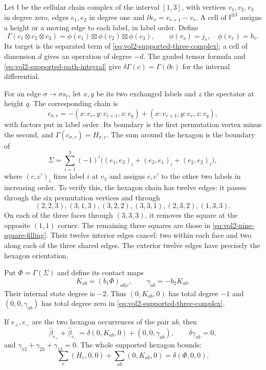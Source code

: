 Let $\mathsf I$ be the cellular chain complex of the interval
$[1,3]$, with vertices $v_1,v_2,v_3$ in degree zero, edges
$e_1,e_2$ in degree one and
$\partial e_r=v_{r+1}-v_r$. A cell of $\mathsf I^{\otimes3}$
assigns a height or a moving edge to each label, in label
order. Define
\[
 \Gamma(c_1\otimes c_2\otimes c_3)
 =\phi(c_1)\boxtimes\phi(c_2)\boxtimes\phi(c_3),
 \qquad \phi(v_s)=j_s,\quad\phi(e_r)=h_r.
\]
Its target is the separated term of
\eqref{eq:vol2-supported-three-complex}; a cell of dimension
$d$ gives an operation of degree $-d$. The graded tensor
formula and \eqref{eq:vol2-supported-path-integral} give
$\delta\Gamma(c)=\Gamma(\partial c)$ for the internal
differential.

For an edge $\sigma\to\sigma s_r$, let $x,y$ be its two
exchanged labels and $z$ the spectator at height $q$.
The corresponding chain is
\[
 c_{\sigma,r}=-(x:e_r,y:v_{r+1},z:v_q)
                  +(x:v_{r+1},y:e_r,z:v_q),
\]
with factors put in label order. Its boundary is the first
permutation vertex minus the second, and
$\Gamma(c_{\sigma,r})=H_{\sigma,r}$.
The sum around the hexagon is the boundary of
\begin{equation}\label{eq:vol2-nine-square-filling}
 \Sigma=\sum_{i=1}^3(-1)^i
       \bigl((e_1,e_2)_i+(e_2,e_1)_i+(e_2,e_2)_i\bigr),
\end{equation}
where $(c,c')_i$ fixes label $i$ at $v_3$ and assigns $c,c'$
to the other two labels in increasing order. To verify this,
the hexagon chain has twelve edges: it passes through the six
permutation vertices and through
\[
 (2,2,3),(3,1,3),(3,2,2),(3,3,1),(2,3,2),(1,3,3).
\]
On each of the three faces through $(3,3,3)$, it removes the
square at the opposite $(1,1)$ corner. The remaining three
squares are those in \eqref{eq:vol2-nine-square-filling}.
Their twelve interior edges cancel: two within each face and
two along each of the three shared edges. The exterior twelve
edges have precisely the hexagon orientation.

Put $\Phi=\Gamma(\Sigma)$ and define its contact maps
\begin{equation}\label{eq:vol2-cube-contacts}
 K_{ab}=(b_1\Phi)_{ab|c},\qquad \gamma_{ab}=-b_2K_{ab}.
\end{equation}
Their internal state degree is $-2$. Thus $(0,K_{ab},0)$
has total degree $-1$ and $(0,0,\gamma_{ab})$ has total
degree zero in \eqref{eq:vol2-supported-three-complex}.

\begin{proposition}\label{prop:vol2-cube-contacts}
If $e_+,e_-$ are the two hexagon occurrences of the pair $ab$,
then
\begin{equation}\label{eq:vol2-cube-pair-identity}
 \widehat\beta_{e_+}+\widehat\beta_{e_-}
       =\delta(0,K_{ab},0)+(0,0,\gamma_{ab}),
 \qquad \delta\gamma_{ab}=0,
\end{equation}
and $\gamma_{12}+\gamma_{23}+\gamma_{13}=0$.
The whole supported hexagon bounds:
\[
 \sum_e(H_e,0,0)+\sum_{ab}(0,K_{ab},0)=\delta(\Phi,0,0).
\]
\end{proposition}

